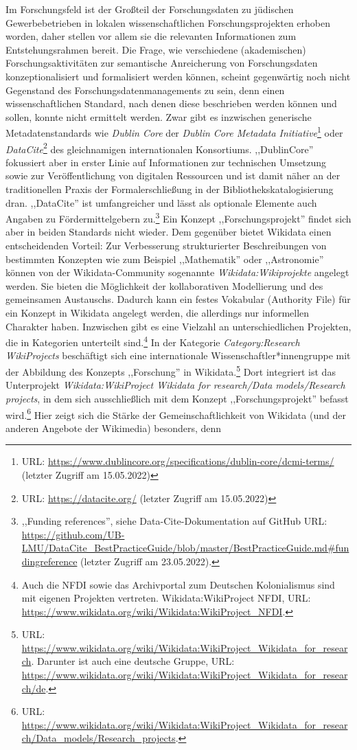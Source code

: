 Im Forschungsfeld ist der Großteil der Forschungsdaten zu jüdischen Gewerbebetrieben in lokalen wissenschaftlichen Forschungsprojekten erhoben worden, daher stellen vor allem sie die relevanten Informationen zum Entstehungsrahmen bereit. Die Frage, wie verschiedene (akademischen) Forschungsaktivitäten zur semantische Anreicherung von Forschungsdaten konzeptionalisiert und formalisiert werden können, scheint gegenwärtig noch nicht Gegenstand des Forschungsdatenmanagements zu sein, denn einen wissenschaftlichen Standard, nach denen diese beschrieben werden können und sollen, konnte nicht ermittelt werden. Zwar gibt es inzwischen generische Metadatenstandards wie \textit{Dublin Core} der \textit{Dublin Core Metadata Initiative}\footnote{URL: \url{https://www.dublincore.org/specifications/dublin-core/dcmi-terms/} (letzter Zugriff am 15.05.2022)} oder \textit{DataCite}\footnote{URL: \url{https://datacite.org/} (letzter Zugriff am 15.05.2022)} des gleichnamigen internationalen Konsortiums. ,,DublinCore'' fokussiert aber in erster Linie auf Informationen zur technischen Umsetzung sowie zur Veröffentlichung von digitalen Ressourcen und ist damit näher an der traditionellen Praxis der Formalerschließung in der Bibliothekskatalogisierung dran. ,,DataCite'' ist umfangreicher und lässt als optionale Elemente auch Angaben zu Fördermittelgebern zu.\footnote{,,Funding references'', siehe Data-Cite-Dokumentation auf GitHub URL: \url{https://github.com/UB-LMU/DataCite\_BestPracticeGuide/blob/master/BestPracticeGuide.md\#fundingreference} (letzter Zugriff am 23.05.2022).} Ein Konzept ,,Forschungsprojekt'' findet sich aber in beiden Standards nicht wieder. Dem gegenüber bietet Wikidata einen entscheidenden Vorteil: Zur Verbesserung strukturierter Beschreibungen von bestimmten Konzepten wie zum Beispiel ,,Mathematik'' oder ,,Astronomie'' können von der Wikidata-Community sogenannte \textit{Wikidata:Wikiprojekte} angelegt werden. Sie bieten die Möglichkeit der kollaborativen Modellierung und des gemeinsamen Austauschs. Dadurch kann ein festes Vokabular (Authority File) für ein Konzept in Wikidata angelegt werden, die allerdings nur informellen Charakter haben. Inzwischen gibt es eine Vielzahl an unterschiedlichen Projekten, die in Kategorien unterteilt sind.\footnote{Auch die NFDI sowie das Archivportal zum Deutschen Kolonialismus sind mit eigenen Projekten vertreten. Wikidata:WikiProject NFDI, URL: \url{https://www.wikidata.org/wiki/Wikidata:WikiProject_NFDI}.} In der Kategorie \textit{Category:Research WikiProjects} beschäftigt sich eine internationale Wissenschaftler*innengruppe mit der Abbildung des Konzepts ,,Forschung'' in Wikidata.\footnote{URL: \url{https://www.wikidata.org/wiki/Wikidata:WikiProject_Wikidata_for_research}. Darunter ist auch eine deutsche Gruppe, URL: \url{https://www.wikidata.org/wiki/Wikidata:WikiProject_Wikidata_for_research/de}.} Dort integriert ist das Unterprojekt \textit{Wikidata:WikiProject Wikidata for research/Data models/Research projects}, in dem sich ausschließlich mit dem Konzept ,,Forschungsprojekt'' befasst wird.\footnote{URL: \url{https://www.wikidata.org/wiki/Wikidata:WikiProject_Wikidata_for_research/Data_models/Research_projects}.} Hier zeigt sich die Stärke der Gemeinschaftlichkeit von Wikidata (und der anderen Angebote der Wikimedia) besonders, denn 